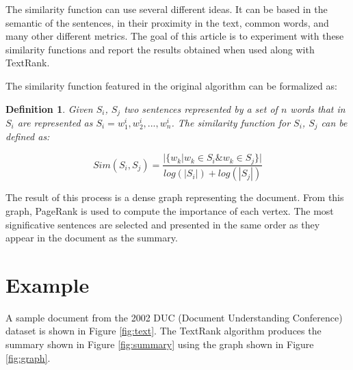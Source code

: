 \documentclass{llncs}
\newtheorem{definicion}{Definition}
\begin{document}
The similarity function can use several different ideas. It can be based in the semantic of the sentences, in their proximity in the text, common words, and many other different metrics. The goal of this article is to experiment with these similarity functions and report the results obtained when used along with TextRank.

The similarity function featured in the original algorithm can be formalized as:


\begin{definicion}
Given $S_i$, $S_j$ two sentences represented by a set of $n$ words that in 
$S_i$ are represented as $S_i = w_{1}^{i}, w_{2}^{i},..., w_{n}^{i}$. The similarity function for $S_i$, $S_j$ can be defined as:


\begin{equation}
Sim(S_{i},S_{j}) = \frac{ | \{   w_{k} | w_{k} \in S_{i} \& w_{k} \in S_{j}   \}  | }    
                              {  log(|S_{i}|) + log(|S_{j}|)  }
\end{equation}


\end{definicion}

The result of this process is a dense graph representing the document. From this graph, PageRank is used to compute the importance of each vertex. The most significative sentences are selected and presented in the same order as they appear in the document as the summary.

\section{Example}
A sample document from the 2002 DUC (Document Understanding Conference) dataset \cite{duc2002-guidelines} is shown in Figure \ref{fig:text}. The TextRank algorithm produces the summary shown in Figure \ref{fig:summary} using the graph shown in Figure \ref{fig:graph}.
\end{document}
